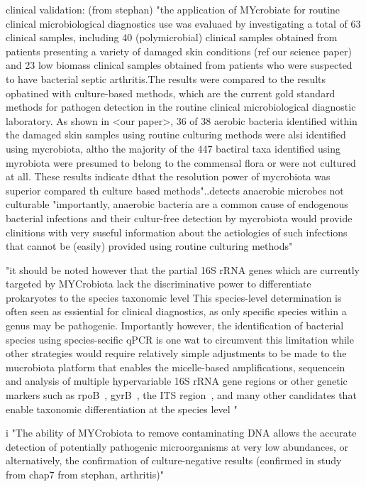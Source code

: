 clinical validation: (from stephan) "the application of MYcrobiate for routine clinical microbiological diagnostics use was evaluaed by investigating a total of 63 clinical samples, including 40 (polymicrobial) clinical samples obtained from patients presenting a variety of damaged skin conditions (ref our science paper) and 23 low biomass clinical samples obtained from patients who were suspected to have bacterial septic arthritis.The results were compared to the results opbatined with culture-based methods, which are the current gold standard methods for pathogen detection in the routine clinical microbiological diagnostic laboratory.
As shown in <our paper>, 36 of 38 aerobic bacteria identified within the damaged skin samples using routine culturing methods were alsi identified using mycrobiota, altho the majority of the 447 bactiral taxa identified using myrobiota were presumed to belong to the commensal flora or were not cultured at all. These results indicate dthat the resolution power of mycrobiota was superior compared th culture based methods"..detects anaerobic microbes not culturable "importantly, anaerobic bacteria are a common cause of endogenous bacterial infections and their cultur-free detection by mycrobiota would provide clinitions with very suseful information about the aetiologies of such infections that cannot be (easily) provided using routine culturing methods"

"it should be noted however that the partial 16S rRNA genes which are currently targeted by MYCrobiota lack the discriminative power to differentiate prokaryotes to the species taxonomic level \cite{konstantinidis2007prokaryotic} This species-level  determination is often seen as essiential for clinical diagnostics, as only specific species within a genus may be pathogenie. Importantly however, the identification  of bacterial species using species-secific qPCR is one wat to circumvent this limitation while other strategies would require relatively simple adjustments to be made to the mucrobiota platform that enables the micelle-based amplifications, sequencein and analysis of multiple hypervariable 16S rRNA gene regions \cite{jumpstart2012evaluation} or other genetic markers such as rpoB~\cite{adekambi2009rpob}, gyrB~\cite{yanamoto1995pcr}, the ITS region~\cite{schoch20012nuclear}, and many other candidates that enable taxonomic differentiation at the species level \cite{lab2016marker,sabat2017targeted}"

i
"The ability of MYCrobiota to remove contaminating DNA allows the accurate detection of potentially pathogenic microorganisms at very low abundances, or alternatively, the confirmation of culture-negative results (confirmed in study from chap7 from stephan, arthritis)"


